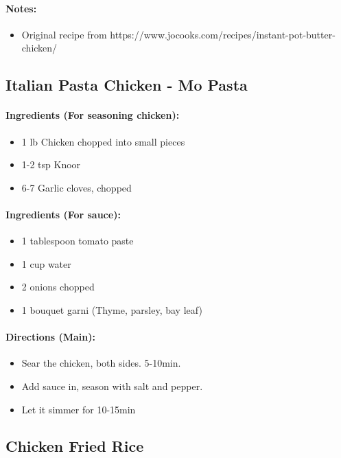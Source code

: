 \documentclass{article}
\begin{document}
\paragraph{Notes:}
\begin{itemize}
    \item Original recipe from https://www.jocooks.com/recipes/instant-pot-butter-chicken/
\end{itemize}

\subsection{Italian Pasta Chicken - Mo Pasta} 

\paragraph{Ingredients (For seasoning chicken):}
\begin{itemize}
    \item 1 lb Chicken chopped into small pieces
    \item 1-2 tsp Knoor
    \item 6-7 Garlic cloves, chopped
\end{itemize}  

\paragraph{Ingredients (For sauce):}
\begin{itemize}
    \item 1 tablespoon tomato paste
    \item 1 cup water
    \item 2 onions chopped
    \item 1 bouquet garni (Thyme, parsley, bay leaf)
\end{itemize}  

\paragraph{Directions (Main):}
\begin{itemize}
    \item Sear the chicken, both sides. 5-10min.
    \item Add sauce in, season with salt and pepper.
    \item Let it simmer for 10-15min
\end{itemize} 

\subsection{Chicken Fried Rice}
\end{document}
